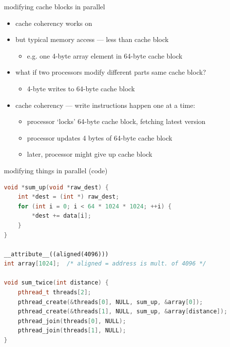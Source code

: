 \begin{frame}{modifying cache blocks in parallel}
\begin{itemize}
\item cache coherency works on 
\item but typical memory access --- less than cache block
    \begin{itemize}
    \item e.g. one 4-byte array element in 64-byte cache block
    \end{itemize}
\vspace{.5cm}
\item what if two processors modify different parts same cache block?   
    \begin{itemize}
    \item 4-byte writes to 64-byte cache block
    \end{itemize}
\item cache coherency --- write instructions happen one at a time:
    \begin{itemize}
    \item processor `locks' 64-byte cache block, fetching latest version
    \item processor updates 4 bytes of 64-byte cache block
    \item later, processor might give up cache block
    \end{itemize}
\end{itemize}
\end{frame}

\begin{frame}[fragile,label=paralleModCode]{modifying things in parallel (code)}
\begin{lstlisting}[language=C++,style=smaller]
void *sum_up(void *raw_dest) {
    int *dest = (int *) raw_dest;
    for (int i = 0; i < 64 * 1024 * 1024; ++i) {
        *dest += data[i];
    }
}

__attribute__((aligned(4096))) 
int array[1024];  /* aligned = address is mult. of 4096 */

void sum_twice(int distance) {
    pthread_t threads[2];
    pthread_create(&threads[0], NULL, sum_up, &array[0]);
    pthread_create(&threads[1], NULL, sum_up, &array[distance]);
    pthread_join(threads[0], NULL);
    pthread_join(threads[1], NULL);
}
\end{lstlisting}
\end{frame}

